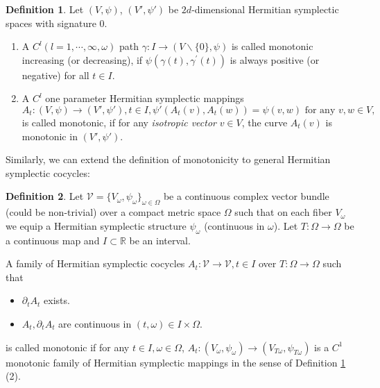 \documentclass[11pt]{amsart}
\theoremstyle{remark}
\theoremstyle{definition}
\newtheorem{definition}{Definition}
\newcommand{\R}{{\mathbf R}}
\newcommand{\V}{{\mathbf V}}
\def \V{\mathcal{V}}
\def\R{{\mathbb R}}
\begin{document}
\begin{definition}\label{def: mono HSp mapping}
Let $(V,\psi)$, $(V', \psi')$ be $2d$-dimensional Hermitian symplectic spaces with signature $0$.
\begin{enumerate}
     \item  A $C^l (l=1,\cdots,\infty,\omega)$ path $\gamma: I \rightarrow\left(V\backslash\{0\}, \psi\right)$ is called monotonic increasing (or decreasing), if $\psi\left(\gamma(t), \gamma^{\prime}(t)\right)$ is always positive (or negative) for all $t \in I$.
     \item A $C^l$ one parameter Hermitian symplectic mappings $$A_t: (V,\psi)\to (V',\psi'), t \in I, \psi'(A_t(v),A_t(w))=\psi(v,w)\text{ for any }v,w \in V,$$ is called monotonic, if for any \textit{isotropic vector} $v \in V$, the curve $A_t(v)$ is monotonic in $(V',\psi')$.
 \end{enumerate}
\end{definition}
Similarly, we can extend the definition of monotonicity to general Hermitian symplectic cocycles:
\begin{definition}\label{def: mono HSp cccle}
Let $\mathcal V=\{V_\omega, \psi_\omega\}_{\omega\in \Omega}$ be a continuous complex vector bundle (could be non-trivial) over a compact metric space $\Omega$ such that on each fiber $V_\omega$ we equip a Hermitian symplectic structure $\psi_\omega$ (continuous in $\omega$). Let $T:\Omega\to \Omega$ be a continuous map and $I\subset \R$ be an interval. 

A family of Hermitian symplectic cocycles $A_t:\V\to \V, t\in I$ over $T:\Omega\to \Omega$ such that 
\begin{itemize}
    \item $\partial_t A_t$ exists.
    \item $A_t, \partial_t A_t$ are continuous in $(t,\omega)\in I\times \Omega$.
\end{itemize}
 is called monotonic if for any $t\in I, \omega\in \Omega$, $A_t: (V_\omega,\psi_\omega)\to (V_{T\omega},\psi_{T\omega})$ is a $C^1$ monotonic family of Hermitian symplectic mappings in the sense of Definition \ref{def: mono HSp mapping} (2).

    
\end{definition}
\end{document}
